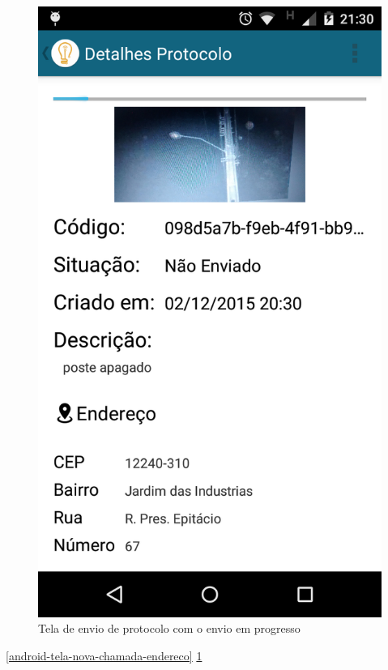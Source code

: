 \documentclass[
	article,			%
	11pt,				%
	oneside,			%
	a4paper,			%
	english,			%
	brazil,				%
	sumario=tradicional
	]{abntex2}
\begin{document}
\begin{figure}[!htbp]
\begin{minipage}{0.4\textwidth}
    \centering
    \caption{\label{android-tela-enviando}Tela de envio de protocolo com o envio em progresso}
    \includegraphics[scale=0.1]{android/6.png}
  \end{minipage}
\end{figure}

\ref{android-tela-nova-chamada-endereco} \ref{android-tela-enviando}
\end{document}

